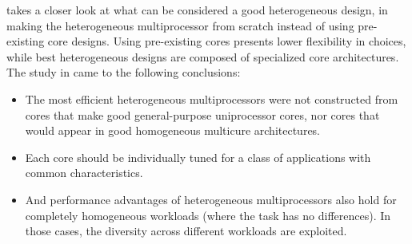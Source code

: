 

\cite{heterogeneous-arch} takes a closer look at what can be considered a good heterogeneous design, in making the heterogeneous multiprocessor from scratch instead of using pre-existing core designs.
Using pre-existing cores presents lower flexibility in choices, while best heterogeneous designs are composed of specialized core architectures.
The study in \cite{heterogeneous-arch} came to the following conclusions:
\begin{itemize}
\item The most efficient heterogeneous multiprocessors were not constructed from cores that make good general-purpose uniprocessor cores, nor cores that would appear in good homogeneous multicure architectures.
\item Each core should be individually tuned for a class of applications with common characteristics.
\item And performance advantages of heterogeneous multiprocessors also hold for completely homogeneous workloads (where the task has no differences).
    In those cases, the diversity across different workloads are exploited.
\end{itemize}

